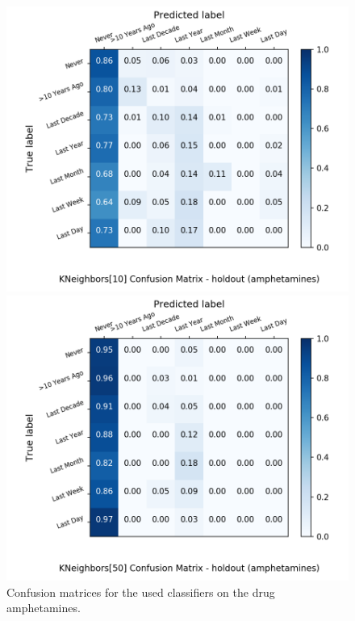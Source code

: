 \begin{figure}[H]
\begin{minipage}[b]{0.32\textwidth}
		\includegraphics[width=1.1\textwidth]{Plots/drugs/amphetamines_KNeighbors_10_balance_False_holdout.png}
  \end{minipage}
	\begin{minipage}[b]{0.32\textwidth}
		\includegraphics[width=1.1\textwidth]{Plots/drugs/amphetamines_KNeighbors_50_balance_False_holdout.png}
  \end{minipage}
	\caption{Confusion matrices for the used classifiers on the drug amphetamines.}
\end{figure}

